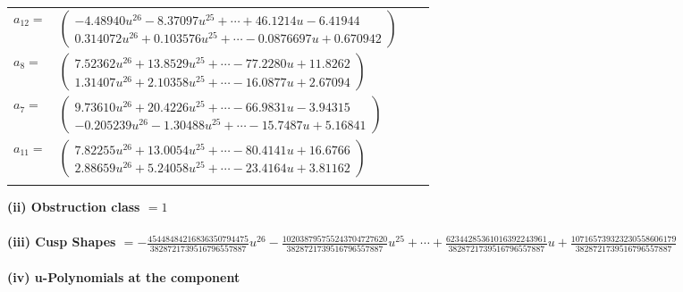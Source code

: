 \documentclass[1p]{elsarticle_modified}
\theoremstyle{definition}
\begin{document}
\begin{tabular}{m{7pt} m{180pt} m{7pt} m{180pt} }
\flushright $a_{12}=$&$\begin{pmatrix}-4.48940 u^{26}-8.37097 u^{25}+\cdots+46.1214 u-6.41944\\0.314072 u^{26}+0.103576 u^{25}+\cdots-0.0876697 u+0.670942\end{pmatrix}$ \\
\flushright $a_{8}=$&$\begin{pmatrix}7.52362 u^{26}+13.8529 u^{25}+\cdots-77.2280 u+11.8262\\1.31407 u^{26}+2.10358 u^{25}+\cdots-16.0877 u+2.67094\end{pmatrix}$ \\
\flushright $a_{7}=$&$\begin{pmatrix}9.73610 u^{26}+20.4226 u^{25}+\cdots-66.9831 u-3.94315\\-0.205239 u^{26}-1.30488 u^{25}+\cdots-15.7487 u+5.16841\end{pmatrix}$ \\
\flushright $a_{11}=$&$\begin{pmatrix}7.82255 u^{26}+13.0054 u^{25}+\cdots-80.4141 u+16.6766\\2.88659 u^{26}+5.24058 u^{25}+\cdots-23.4164 u+3.81162\end{pmatrix}$\\&\end{tabular}
\flushleft \textbf{(ii) Obstruction class $= 1$}\\~\\
\flushleft \textbf{(iii) Cusp Shapes $= -\frac{45448484216836350794475}{3828721739516796557887} u^{26}-\frac{102038795755243704727620}{3828721739516796557887} u^{25}+\cdots+\frac{62344285361016392243961}{3828721739516796557887} u+\frac{107165739323230558606179}{3828721739516796557887}$}\\~\\
\newpage\renewcommand{\arraystretch}{1}
\flushleft \textbf{(iv) u-Polynomials at the component}\newline \\
\end{document}
